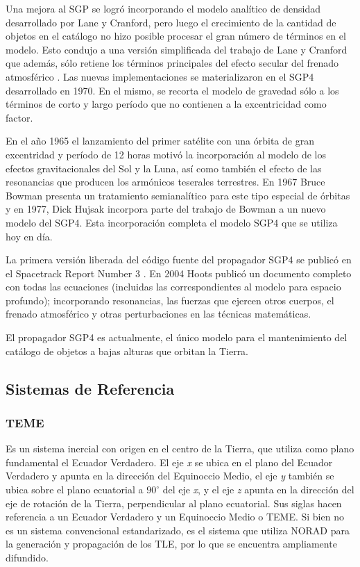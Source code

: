 {Una mejora al SGP se logr\'o incorporando el modelo anal\'itico de densidad desarrollado por Lane y Cranford, pero luego el crecimiento de la cantidad de objetos en el cat\'alogo no hizo posible procesar el gran n\'umero de t\'erminos en el modelo. Esto condujo a una versi\'on simplificada del trabajo de Lane y Cranford que adem\'as, s\'olo retiene los t\'erminos principales del efecto secular del frenado atmosf\'erico \citep{lane1979general}. Las nuevas implementaciones se materializaron en el SGP4 desarrollado en 1970. En el mismo, se recorta el modelo de gravedad s\'olo a los t\'erminos de corto y largo per\'iodo que no contienen a la excentricidad como factor. 

En el a\~no 1965 el lanzamiento del primer sat\'elite con una \'orbita de gran excentridad y per\'iodo de 12 horas motiv\'o la incorporaci\'on al modelo de los efectos gravitacionales del Sol y la Luna, as\'i como tambi\'en el efecto de las resonancias que producen los arm\'onicos teserales terrestres. En 1967 Bruce Bowman \citep{bowman1971first} presenta un tratamiento semianal\'itico para este tipo especial de \'orbitas y en 1977, Dick Hujsak \citep{hujsak1979restricted} incorpora parte del trabajo de Bowman a un nuevo modelo del SGP4. Esta incorporaci\'on completa el modelo SGP4 que se utiliza hoy en d\'ia.

La primera versi\'on liberada del c\'odigo fuente del propagador SGP4 se public\'o en el Spacetrack Report Number 3 \citep{spacetrackreport3}. En 2004 Hoots public\'o un documento completo \citep{hoots2004history} con todas las ecuaciones (incluidas las correspondientes al modelo para espacio profundo); incorporando resonancias, las fuerzas que ejercen otros cuerpos, el frenado atmosf\'erico y otras perturbaciones en las t\'ecnicas matem\'aticas.

El propagador SGP4 es actualmente, el \'unico modelo para el mantenimiento del cat\'alogo de objetos a bajas alturas que orbitan la Tierra. 

\subsection{Sistemas de Referencia}\label{subsec:sistRef}

\subsubsection*{\ac{TEME}}
 Es un sistema inercial con origen en el centro de la Tierra, que utiliza como plano fundamental el Ecuador Verdadero. El eje {\it{x}} se ubica en el plano del Ecuador Verdadero y apunta en la direcci\'on del Equinoccio Medio, el eje {\it{y}} tambi\'en se ubica sobre el plano ecuatorial a $90^{\circ}$ del eje {\it{x}}, y el eje {\it{z}} apunta en la direcci\'on del eje de rotaci\'on de la Tierra, perpendicular al plano ecuatorial. Sus siglas hacen referencia a un Ecuador Verdadero y un Equinoccio Medio o \ac{TEME}. Si bien no es un sistema convencional estandarizado, es el sistema que utiliza NORAD para la generaci\'on y propagaci\'on de los TLE, por lo que se encuentra ampliamente difundido.
 
}
